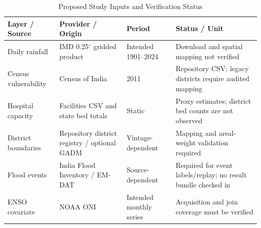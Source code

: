 \begin{table}[htbp]
\caption{Proposed Study Inputs and Verification Status}
\label{tab:datasets}
\centering
\begin{tabular}{|l|l|l|l|}
\hline
\textbf{Layer / Source} & \textbf{Provider / Origin} & \textbf{Period} & \textbf{Status / Unit} \\ \hline
Daily rainfall & IMD 0.25$^\circ$ gridded product & Intended 1901--2024 & Download and spatial mapping not verified \\ \hline
Census vulnerability & Census of India & 2011 & Repository CSV; legacy districts require audited mapping \\ \hline
Hospital capacity & Facilities CSV and state bed totals & Static & Proxy estimates; district bed counts are not observed \\ \hline
District boundaries & Repository district registry / optional GADM & Vintage-dependent & Mapping and areal-weight validation required \\ \hline
Flood events & India Flood Inventory / EM-DAT & Source-dependent & Required for event labels/replay; no result bundle checked in \\ \hline
ENSO covariate & NOAA ONI & Intended monthly series & Acquisition and join coverage must be verified \\ \hline
\end{tabular}
\end{table}
